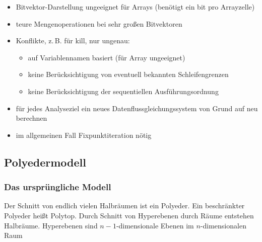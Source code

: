 \begin{itemize}
  \item Bitvektor-Darstellung ungeeignet für Arrays (benötigt ein bit pro Arrayzelle)
  \item teure Mengenoperationen bei sehr großen Bitvektoren
  \item Konflikte, z.\,B. für kill, nur ungenau:
    \begin{itemize}
    \item auf Variablennamen basiert (für Array ungeeignet)
    \item keine Berücksichtigung von eventuell bekannten Schleifengrenzen
    \item keine Berücksichtigung der sequentiellen Ausführungsordnung
    \end{itemize}
  \item für jedes Analyseziel ein neues Datenflussgleichungssystem von Grund auf neu berechnen
  \item im allgemeinen Fall Fixpunktiteration nötig
\end{itemize}

\subsection{Polyedermodell}
\label{sec:polymod}

\subsubsection{Das ursprüngliche Modell}
\label{sec:orig-mod}

Der Schnitt von endlich vielen Halbräumen ist ein Polyeder.
Ein beschränkter Polyeder heißt Polytop.
Durch Schnitt von Hyperebenen durch Räume entstehen Halbräume.
Hyperebenen sind $n-1$-dimensionale Ebenen im $n$-dimensionalen Raum

